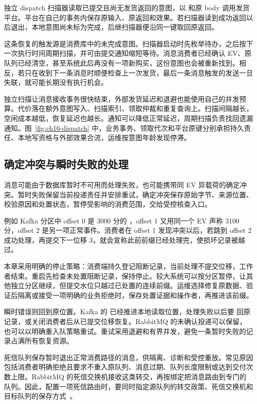 独立 dispatch 扫描器读取已提交且尚无发货返回的意图，以  和原 body 调用发货平台。平台在自己的事务内保存原输入、原返回和效果。若扫描器读到成功返回以后退出，本地意图尚未标为完成，后继扫描器便沿同一键取回原返回。

这条恢复的触发源是消费库中的未完成意图。扫描器启动时先枚举待办，之后按下一次执行时间周期扫描，并可由提交通知缩短等待。消息消费者已经确认 EV、原队列已经清空，甚至系统此后再没有一项新购买，这份意图也会被重新找到。相反，若只在收到下一条消息时顺便检查上一次发货，最后一条消息触发的发送一旦失联，就可能长期没有执行机会。

独立扫描让消息接收事务很快结束，外部发货延迟和退避也能使用自己的并发预算。代价落在额外意图写入、扫描索引、领取仲裁和重复查询上。扫描间隔越长，空闲成本越低，恢复延迟也越长。通知可以降低正常延迟，周期扫描负责找回遗漏通知。图~\ref{fig:ch16-dispatch} 中，业务事务、领取代次和平台原键分别承担持久责任、本地写资格与外部效果合流，运维按意图年龄发现停滞。


\subsection{确定冲突与瞬时失败的处理}

消息可能由于数据库暂时不可用而处理失败，也可能携带同 EV 异载荷的确定冲突。暂时失败保留当前投递责任并安排重试，确定冲突保存原始字节、来源位置、校验原因和处置状态，暂停受影响的消费范围，交给受控核查入口。

例如 Kafka 分区中 offset 0 是 3000 分的 ，offset 1 又用同一个 EV 声称 3100 分，offset 2 是另一项正常事件。消费者在 offset 1 发现冲突以后，若跳到 offset 2 成功处理，再提交下一位移 3，就会宣称此前前缀已经处理完，使损坏记录被越过。

本章采用明确的停止策略：消费端持久登记阻断记录，当前处理不提交位移，工作者结束。重启先检查未处置阻断记录，保持停止。较大系统可以按分区暂停，让其他独立分区继续，但提交水位只越过已处置的连续前缀。运维选择修复原数据、验证后隔离或接受一项明确的业务拒绝时，保存处置证据和操作者，再推进该前缀。

瞬时错误则回到原位置。Kafka 的  已经推进本地读取位置，处理失败以后要  回原记录，或关闭消费者后从已提交位移恢复。RabbitMQ 的未确认投递可以保留，也可以以明确重入队策略重试。重试采用退避和有界并发，避免一条暂时失败的记录占满所有恢复资源。

死信队列保存暂时退出正常消费路径的消息，供隔离、诊断和受控重放。常见原因包括消费者明确拒绝且要求不重入原队列、消息过期、队列长度限制或达到交付次数上限。RabbitMQ 的死信交换机接收这类转交，再按绑定把消息路由到专门的队列。因此，配置一项死信路由时，要同时指定源队列的转交政策、死信交换机和目标队列的保存方式~\cite{rabbitmq-quorum-queues,rabbitmq-queues}。

